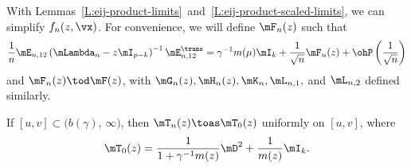 With Lemmas~\ref{L:eij-product-limits}~and~\ref{L:eij-product-scaled-limits},
we can simplify $f_n(z, \vx)$.  For convenience, we will define
$\mF_n (z)$ such that
\[
    \frac{1}{n}
    \mE_{n,12}
    \left(
        \mLambda_n
        -
        z
        \mI_{p-k}
    \right)^{-1}
    \mE_{n,12}^\trans
        =
            \gamma^{-1}
            m(\mu)
            \mI_k
            +
            \frac{1}{\sqrt{n}}
            \mF_n(z)
            +
            \ohP\left(
                \frac{1}{\sqrt{n}}
            \right)
\]
and $\mF_n(z) \tod \mF(z)$,
with $\mG_n(z), \mH_n(z), \mK_n, \mL_{n,1},$ and $\mL_{n,2}$ defined similarly.

\begin{lemma}
    If $[u,v] \subset \big( b(\gamma), \, \infty \big)$, then
    \(
        \mT_n( z )
            \toas
                \mT_0( z )
    \)
    uniformly on $[u,v]$, where
    \[
        \mT_0( z )
            =
                \frac{1}{ 1 + \gamma^{-1} m(z) }
                \mD^2 
                +
                \frac{1}{m(z)}
                \mI_k.
    \]
\end{lemma}

